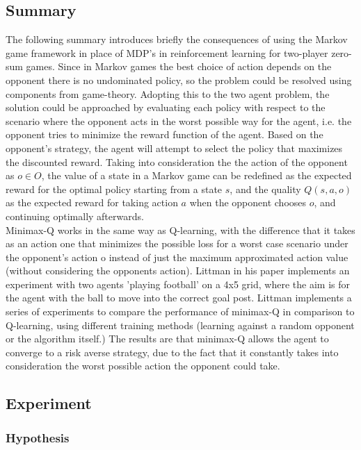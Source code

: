 \documentclass[a4paper,10pt]{article}
\begin{document}
\subsection{Summary}
The following summary introduces briefly the consequences of using the Markov game framework in place of MDP's in reinforcement learning for two-player zero-sum games.
Since in Markov games the best choice of action depends on the opponent there is no undominated policy, so the problem could be resolved using components from game-theory. Adopting this to the two agent problem, the solution could be approached by evaluating each policy with respect to the scenario where the opponent acts in the worst possible way for the agent, i.e. the opponent tries to minimize the reward function of the agent. Based on the opponent's strategy, the agent will attempt to select the policy that maximizes the discounted reward. Taking into consideration the the action of the opponent as $o \in O$, the value of a state in a Markov game can be redefined as the expected reward for the optimal policy starting from a state $s$, and the quality $Q(s,a,o)$ as the expected reward for taking action $a$ when the opponent chooses $o$, and continuing optimally afterwards. \\
Minimax-Q works in the same way as Q-learning, with the difference that it takes as an action one that minimizes the possible loss for a worst case scenario under the opponent's action o instead of just the maximum approximated action value (without considering the opponents action).
Littman in his paper implements an experiment with two agents 'playing football' on a 4x5 grid, where the aim is for the agent with the ball to move into the correct goal post. Littman implements a series of experiments to compare the performance of minimax-Q in comparison to Q-learning, using different training methods (learning against a random opponent or the algorithm itself.) The results are that minimax-Q allows the agent to converge to a risk averse strategy, due to the fact that it constantly takes into consideration the worst possible action the opponent could take. 


\subsection{Experiment}



\subsubsection{Hypothesis}
\end{document}
